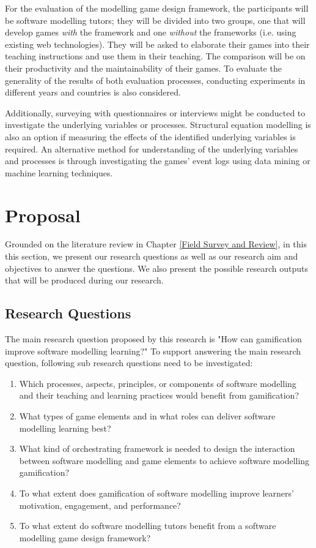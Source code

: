 \documentclass[12pt, a4paper]{report}
\begin{document}
For the evaluation of the modelling game design framework, the participants will be software modelling tutors; they will be divided into two groups, one that will develop games \emph{with} the framework and one \emph{without} the frameworks (i.e. using existing web technologies). They will be asked to elaborate their games into their teaching instructions and use them in their teaching. The comparison will be on their productivity and the maintainability of their games. To evaluate the generality of the results of both evaluation processes, conducting experiments in different years and countries is also considered.

Additionally, surveying with questionnaires or interviews might be conducted to investigate the underlying variables or processes. Structural equation modelling \cite{hair2016primer} is also an option if measuring the effects of the identified underlying variables is required. An alternative method for understanding of the underlying variables and processes is through investigating the games' event logs using data mining or machine learning techniques.


\chapter{Proposal}
\label{Proposal}
Grounded on the literature review in Chapter \ref{Field Survey and Review}, in this this section, we present our research questions as well as our research aim and objectives to answer the questions. We also present the possible research outputs that will be produced during our research.  

\section{Research Questions}
The main research question proposed by this research is "How can gamification improve software modelling learning?" To support answering the main research question, following sub research questions need to be investigated:
\begin{enumerate}
\item Which processes, aspects, principles, or components of software modelling and their teaching and learning practices would benefit from gamification?
\item What types of game elements and in what roles can deliver software modelling learning best? 
\item What kind of orchestrating framework is needed to design the interaction between software modelling and game elements to achieve software modelling gamification?
\item To what extent does gamification of software modelling improve learners' motivation, engagement, and performance?
\item To what extent do software modelling tutors benefit from a software modelling game design framework?
\end{enumerate}
\end{document}
